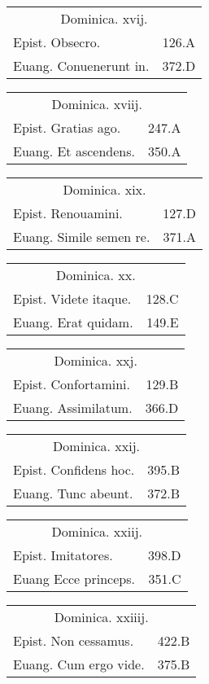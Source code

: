 \documentclass[a5paper,10pt]{book}
\begin{document}
\begin{multicols}{2}
\begin{tabular}{l r}
\multicolumn{2}{c}{\color{red} Dominica. xvij.}\\
Epist. Obsecro. & 126.A\\
Euang. Conuenerunt in. & 372.D\\
\end{tabular}
\begin{tabular}{l r}
\multicolumn{2}{c}{\color{red} Dominica. xviij.}\\
Epist. Gratias ago. & 247.A\\
Euang. Et ascendens. & 350.A\\
\end{tabular}
\begin{tabular}{l r}
\multicolumn{2}{c}{\color{red} Dominica. xix.}\\
Epist. Renouamini. & 127.D\\
Euang. Simile semen re. & 371.A\\
\end{tabular}
\begin{tabular}{l r}
\multicolumn{2}{c}{\color{red} Dominica. xx.}\\
Epist. Videte itaque. & 128.C\\
Euang. Erat quidam. & 149.E\\
\end{tabular}
\begin{tabular}{l r}
\multicolumn{2}{c}{\color{red} Dominica. xxj.}\\
Epist. Confortamini. & 129.B\\
Euang. Assimilatum. & 366.D\\
\end{tabular}
\begin{tabular}{l r}
\multicolumn{2}{c}{\color{red} Dominica. xxij.}\\
Epist. Confidens hoc. & 395.B\\
Euang. Tunc abeunt. & 372.B\\
\end{tabular}
\begin{tabular}{l r}
\multicolumn{2}{c}{\color{red} Dominica. xxiij.}\\
Epist. Imitatores. & 398.D\\
Euang Ecce princeps. & 351.C\\%
\end{tabular}
\begin{tabular}{l r}
\multicolumn{2}{c}{\color{red} Dominica. xxiiij.}\\
Epist. Non cessamus. & 422.B\\
Euang. Cum ergo vide. & 375.B\\

\end{tabular}
\end{multicols}
\end{document}

